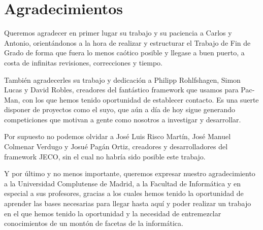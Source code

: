 \chapter{Agradecimientos}
Queremos agradecer en primer lugar su trabajo y su paciencia a Carlos y Antonio, orientándonos a la hora de realizar y estructurar el Trabajo de Fin de Grado de forma que fuera lo menos caótico posible y llegase a buen puerto, a costa de infinitas revisiones, correcciones y tiempo.
 
También agradecerles su trabajo y dedicación a Philipp Rohlfshagen, Simon Lucas y David Robles, creadores del fantástico framework que usamos para Pac-Man, con los que hemos tenido oportunidad de establecer contacto. Es una suerte disponer de proyectos como el suyo, que aún a día de hoy sigue generando competiciones que motivan a gente como nosotros a investigar y desarrollar.
 
Por supuesto no podemos olvidar a José Luis Risco Martín, José Manuel Colmenar Verdugo y Josué Pagán Ortiz, creadores y desarrolladores del framework  JECO, sin el cual no habría sido posible este trabajo.
 
Y por último y no menos importante, queremos expresar nuestro agradecimiento a la Universidad Complutense de Madrid, a la Facultad de Informática y en especial a sus profesores, gracias a los cuales hemos tenido la oportunidad de aprender las bases necesarias para llegar hasta aquí y poder realizar un trabajo en el que hemos tenido la oportunidad y la necesidad de entremezclar conocimientos de un montón de facetas de la informática.
